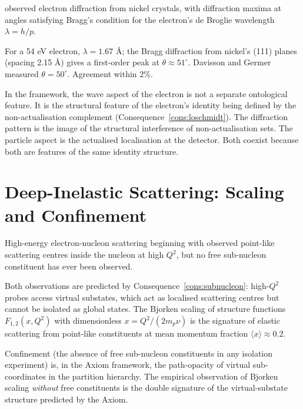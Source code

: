 \citet{davissongermernist} observed electron diffraction from nickel
crystals, with diffraction maxima at angles satisfying Bragg's condition
for the electron's de Broglie wavelength $\lambda=h/p$.

For a 54 eV electron, $\lambda=1.67$ \AA; the Bragg diffraction from
nickel's (111) planes (spacing 2.15 \AA) gives a first-order peak at
$\theta\approx 51^{\circ}$.  Davisson and Germer measured
$\theta=50^{\circ}$.  Agreement within 2\%.

In the framework, the wave aspect of the electron is not a separate
ontological feature.  It is the structural feature of the electron's
identity being defined by the non-actualisation complement
(Consequence~\ref{cons:loschmidt}).  The diffraction pattern is the image
of the structural interference of non-actualisation sets.  The particle
aspect is the actualised localisation at the detector.  Both coexist because
both are features of the same identity structure.

\section{Deep-Inelastic Scattering: Scaling and Confinement}
\label{sec:dis-ch25}

High-energy electron-nucleon scattering beginning with \citet{friedman1972}
observed point-like scattering centres inside the nucleon at high $Q^{2}$,
but no free sub-nucleon constituent has ever been observed.

Both observations are predicted by Consequence~\ref{cons:subnucleon}: high-$Q^{2}$
probes access virtual substates, which act as localised scattering centres
but cannot be isolated as global states.  The Bjorken scaling of structure
functions $F_{1,2}(x,Q^{2})$ with dimensionless $x=Q^{2}/(2m_{p}\nu)$ is
the signature of elastic scattering from point-like constituents at mean
momentum fraction $\langle x\rangle\approx 0.2$.

Confinement (the absence of free sub-nucleon constituents in any isolation
experiment) is, in the Axiom framework, the path-opacity of virtual
sub-coordinates in the partition hierarchy.  The empirical observation of
Bjorken scaling \emph{without} free constituents is the double signature of
the virtual-substate structure predicted by the Axiom.

